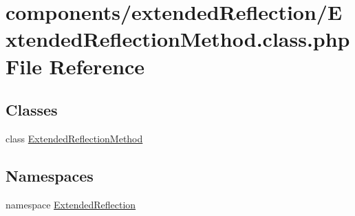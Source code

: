 \hypertarget{_extended_reflection_method_8class_8php}{
\section{components/extendedReflection/ExtendedReflectionMethod.class.php File Reference}
\label{_extended_reflection_method_8class_8php}
}
\subsection*{Classes}
\begin{CompactItemize}
\item 
class \hyperlink{class_extended_reflection_method}{ExtendedReflectionMethod}
\end{CompactItemize}
\subsection*{Namespaces}
\begin{CompactItemize}
\item 
namespace \hyperlink{namespace_extended_reflection}{ExtendedReflection}
\end{CompactItemize}
